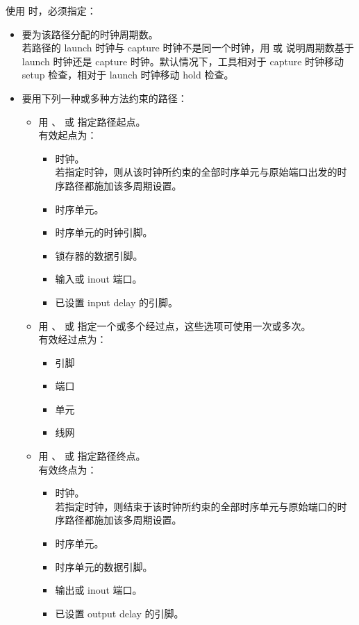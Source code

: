 使用  时，必须指定：
\begin{itemize}
  \item 要为该路径分配的时钟周期数。\\
        若路径的 launch 时钟与 capture 时钟不是同一个时钟，用  或  说明周期数基于 launch 时钟还是 capture 时钟。默认情况下，工具相对于 capture 时钟移动 setup 检查，相对于 launch 时钟移动 hold 检查。
  \item 要用下列一种或多种方法约束的路径：
        \begin{itemize}
          \item 用 、 或  指定路径起点。\\
                有效起点为：
                \begin{itemize}
                  \item 时钟。\\
                        若指定时钟，则从该时钟所约束的全部时序单元与原始端口出发的时序路径都施加该多周期设置。
                  \item 时序单元。
                  \item 时序单元的时钟引脚。
                  \item 锁存器的数据引脚。
                  \item 输入或 inout 端口。
                  \item 已设置 input delay 的引脚。
                \end{itemize}
          \item 用 、 或  指定一个或多个经过点，这些选项可使用一次或多次。\\
                有效经过点为：
                \begin{itemize}
                  \item 引脚
                  \item 端口
                  \item 单元
                  \item 线网
                \end{itemize}
          \item 用 、 或  指定路径终点。\\
                有效终点为：
                \begin{itemize}
                  \item 时钟。\\
                        若指定时钟，则结束于该时钟所约束的全部时序单元与原始端口的时序路径都施加该多周期设置。
                  \item 时序单元。
                  \item 时序单元的数据引脚。
                  \item 输出或 inout 端口。
                  \item 已设置 output delay 的引脚。
                \end{itemize}
        \end{itemize}
\end{itemize}

